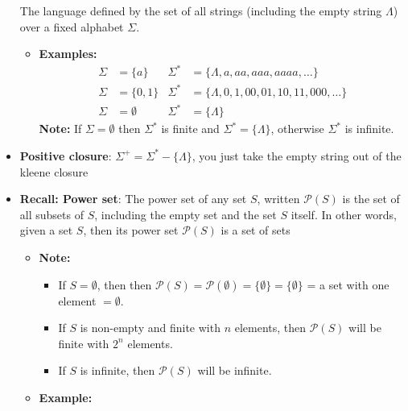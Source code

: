 \documentclass{report}
\begin{document}
\begin{itemize}
            The language defined by the set of all strings (including the empty string $\Lambda$) over a fixed alphabet $\Sigma$.
            \begin{itemize}
                \item \textbf{Examples:}
                    \begin{align*}
                        \Sigma &= \{a\} & \Sigma^* &= \{\Lambda, a, aa, aaa, aaaa, \dots\} \\
                        \Sigma &= \{0, 1\} & \Sigma^* &= \{\Lambda, 0, 1, 00, 01, 10, 11, 000, \dots\} \\
                        \Sigma &= \emptyset & \Sigma^* &= \{\Lambda\}
                    \end{align*}
                    \bigbreak \noindent 
                    \textbf{Note:} If $\Sigma = \emptyset$ then $\Sigma^*$ is finite and $\Sigma^* = \{\Lambda\}$, otherwise $\Sigma^*$ is infinite.
            \end{itemize}
        \item \textbf{Positive closure}: $\Sigma^{+} = \Sigma^{*} - \{\Lambda\}$, you just take the empty string out of the kleene closure 
        \item \textbf{Recall: Power set}: The power set of any set $S$, written $\mathcal{P}(S)$ is the set of all subsets of $S$, including the empty set and the set $S$ itself.
            \bigbreak \noindent 
            In other words, given a set $S$, then its power set $\mathcal{P}(S)$ is a set of sets
            \begin{itemize}
                \item \textbf{Note:}
                    \begin{itemize}
                        \item If $S = \emptyset$, then then $\mathcal{P}(S) = \mathcal{P}(\emptyset) = \{\emptyset\} = \{\emptyset\}$ = a set with one element $=\emptyset$.
                        \item If $S$ is non-empty and finite with $n$ elements, then $\mathcal{P}(S)$ will be finite with $2^n$ elements.
                        \item If $S$ is infinite, then $\mathcal{P}(S)$ will be infinite.
                    \end{itemize}

                \item \textbf{Example:}


\end{itemize}
\end{itemize}
\end{document}

